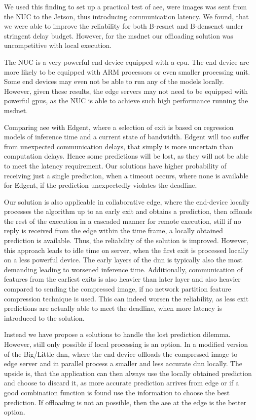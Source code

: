 We used this finding to set up a practical test of \gls{aee}, were images was sent from the NUC to the Jetson, thus introducing communication latency. We found, that we were able to improve the reliability for both B-\gls{resnet} and B-\gls{densenet} under stringent delay budget. However, for the \gls{msdnet} our offloading solution was uncompetitive with local execution. 

The NUC is a very powerful end device equipped with a \gls{cpu}. The end device are more likely to be equipped with ARM processors or even smaller processing unit. Some end devices may even not be able to run any of the models locally. However, given these results, the edge servers may not need to be equipped with powerful \gls{gpu}s, as the NUC is able to achieve such high performance running the \gls{msdnet}.

Comparing \gls{aee} with Edgent, where a selection of exit is based on regression models of inference time and a current state of bandwidth. Edgent will too suffer from unexpected communication delays, that simply is more uncertain than computation delays. Hence some predictions will be lost, as they will not be able to meet the latency requirement. Our solutions have higher probability of receiving just a single prediction, when a timeout occurs, where none is available for Edgent, if the prediction unexpectedly violates the deadline. 

Our solution is also applicable in collaborative edge, where the end-device locally processes the algorithm up to an early exit and obtains a prediction, then offloads the rest of the execution in a cascaded manner for remote execution, still if no reply is received from the edge within the time frame, a locally obtained prediction is available. Thus, the reliability of the solution is improved. However, this approach leads to idle time on server, when the first exit is processed locally on a less powerful device. The early layers of the \gls{dnn} is typically also the most demanding leading to worsened inference time. Additionally, communication of features from the earliest exits is also heavier than later layer and also heavier compared to sending the compressed image, if no network partition feature compression technique is used. This can indeed worsen the reliability, as less exit predictions are actually able to meet the deadline, when more latency is introduced to the solution.

Instead we have propose a solutions to handle the lost prediction dilemma. However, still only possible if local processing is an option. In a modified version of the Big/Little \gls{dnn}, where the end device offloads the compressed image to edge server and in parallel process a smaller and less accurate \gls{dnn} locally. The upside is, that the application can then always use the locally obtained prediction and choose to discard it, as more accurate prediction arrives from edge or if a good combination function is found use the information to choose the best prediction. If offloading is not an possible, then the \gls{aee} at the edge is the better option.

